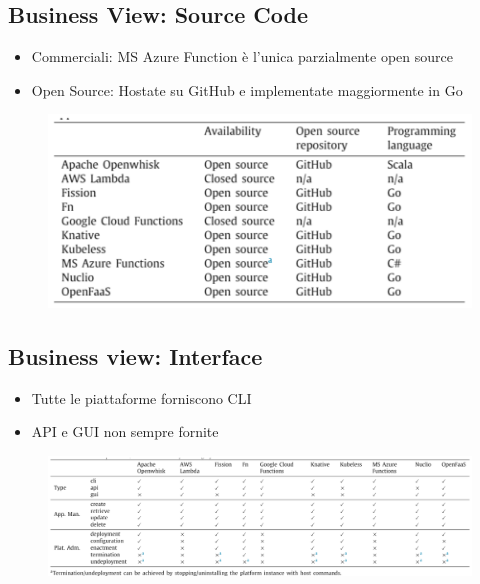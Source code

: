 \documentclass[a4paper, 12pt]{report}
\begin{document}
            \subsection{Business View: Source Code}
            \begin{itemize}
              \item Commerciali: MS Azure Function è l'unica parzialmente open source
              \item Open Source: Hostate su GitHub e implementate maggiormente in Go
            \end{itemize}
            \begin{figure}[h]
              \centering
              \includegraphics[scale=0.4]{Immagini/SourceCode.png}
            \end{figure}
            \subsection{Business view: Interface}
            \begin{itemize}
              \item Tutte le piattaforme forniscono CLI
              \item API e GUI non sempre fornite
            \end{itemize}
            \begin{figure}[h]
              \centering
              \includegraphics[scale=0.35]{Immagini/Interface.png}
            \end{figure}
            \clearpage
\end{document}
